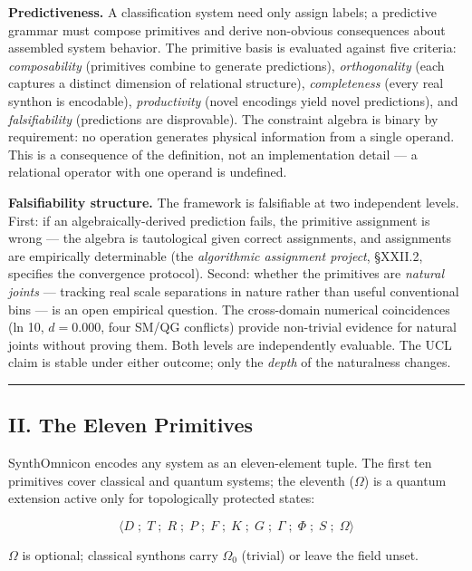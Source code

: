 \documentclass[12pt,a4paper]{article}
\begin{document}
\textbf{Predictiveness.} A classification system need only assign labels; a predictive grammar must compose primitives and derive non-obvious consequences about assembled system behavior. The primitive basis is evaluated against five criteria: \emph{composability} (primitives combine to generate predictions), \emph{orthogonality} (each captures a distinct dimension of relational structure), \emph{completeness} (every real synthon is encodable), \emph{productivity} (novel encodings yield novel predictions), and \emph{falsifiability} (predictions are disprovable). The constraint algebra is binary by requirement: no operation generates physical information from a single operand. This is a consequence of the definition, not an implementation detail --- a relational operator with one operand is undefined.

\textbf{Falsifiability structure.} The framework is falsifiable at two independent levels. First: if an algebraically-derived prediction fails, the primitive assignment is wrong --- the algebra is tautological given correct assignments, and assignments are empirically determinable (the \emph{algorithmic assignment project}, §XXII.2, specifies the convergence protocol). Second: whether the primitives are \emph{natural joints} --- tracking real scale separations in nature rather than useful conventional bins --- is an open empirical question. The cross-domain numerical coincidences (ln 10, $d = 0.000$, four SM/QG conflicts) provide non-trivial evidence for natural joints without proving them. Both levels are independently evaluable. The UCL claim is stable under either outcome; only the \emph{depth} of the naturalness changes.

\begin{center}
\rule{0.5\textwidth}{0.4pt}
\end{center}

\subsection{II. The Eleven Primitives}

SynthOmnicon encodes any system as an eleven-element tuple. The first ten primitives cover classical and quantum systems; the eleventh ($\Omega$) is a quantum extension active only for topologically protected states:

\[\langle D \;;\; T \;;\; R \;;\; P \;;\; F \;;\; K \;;\; G \;;\; \Gamma \;;\; \Phi \;;\; S \;;\; \Omega \rangle\]

$\Omega$ is optional; classical synthons carry $\Omega_0$ (trivial) or leave the field unset.
\end{document}
